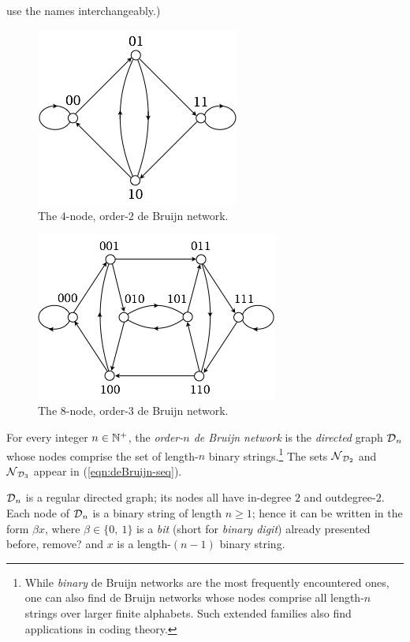 use the names interchangeably.)
\begin{figure}[hbt]
\begin{center}
       \includegraphics[scale=0.5]{FiguresGraph/dB2by2}
       \caption{The $4$-node, order-$2$ de Bruijn network.}
  \label{fig:dB2by2}
\end{center}
\end{figure}

\begin{figure}[hbt]
\begin{center}
       \includegraphics[scale=0.6]{FiguresGraph/dB2by3}
       \caption{The $8$-node, order-$3$ de Bruijn network.}
  \label{fig:dB2by3}
\end{center}
\end{figure}

For every integer $n \in \mathbb{N}^+$, the {\it order-$n$ de Bruijn network}
is the {\em directed} graph $\mbox{$\cal D$}_n$ whose nodes comprise the set of
length-$n$ binary strings.\footnote{While {\em binary} de Bruijn
  networks are the most frequently encountered ones, one can also find
  de Bruijn networks whose nodes comprise all length-$n$ strings over
  larger finite alphabets.  Such extended families also find
  applications in coding theory.}  The sets $\mbox{$\cal N$}_{\mbox{{\scriptsize $\cal D$}}_2}$ and
$\mbox{$\cal N$}_{\mbox{{\scriptsize $\cal D$}}_3}$ appear in (\ref{eqn:deBruijn-seq}).


$\mbox{$\cal D$}_n$ is a regular directed graph; its nodes all have in-degree $2$
and outdegree-$2$.  Each node of $\mbox{$\cal D$}_n$ is a binary string of
length $n \geq 1$; hence it can be written in the form $\beta x$,
where $\beta \in \{0, \ 1\}$ is a {\it bit} (short for {\it binary
  digit}) {\Denis already presented before, remove?} and $x$ is a length-$(n-1)$ binary string.


